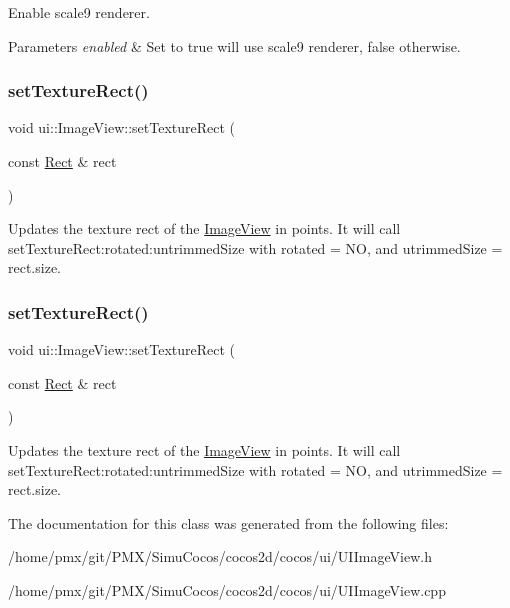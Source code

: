 Enable scale9 renderer.


\begin{DoxyParams}{Parameters}
{\em enabled} & Set to true will use scale9 renderer, false otherwise. \\
\hline
\end{DoxyParams}
\mbox{\label{classui_1_1ImageView_a776968265a527b05e1d13797707e5e2c}} 
\subsubsection{\texorpdfstring{set\+Texture\+Rect()}{setTextureRect()}\hspace{0.1cm}{\footnotesize\ttfamily [1/2]}}
{\footnotesize\ttfamily void ui\+::\+Image\+View\+::set\+Texture\+Rect (\begin{DoxyParamCaption}\item[{const \hyperlink{classRect}{Rect} \&}]{rect }\end{DoxyParamCaption})}

Updates the texture rect of the \hyperlink{classui_1_1ImageView}{Image\+View} in points. It will call set\+Texture\+Rect\+:rotated\+:untrimmed\+Size with rotated = NO, and utrimmed\+Size = rect.\+size. \mbox{\label{classui_1_1ImageView_a776968265a527b05e1d13797707e5e2c}} 
\subsubsection{\texorpdfstring{set\+Texture\+Rect()}{setTextureRect()}\hspace{0.1cm}{\footnotesize\ttfamily [2/2]}}
{\footnotesize\ttfamily void ui\+::\+Image\+View\+::set\+Texture\+Rect (\begin{DoxyParamCaption}\item[{const \hyperlink{classRect}{Rect} \&}]{rect }\end{DoxyParamCaption})}

Updates the texture rect of the \hyperlink{classui_1_1ImageView}{Image\+View} in points. It will call set\+Texture\+Rect\+:rotated\+:untrimmed\+Size with rotated = NO, and utrimmed\+Size = rect.\+size. 

The documentation for this class was generated from the following files\+:\begin{DoxyCompactItemize}
\item 
/home/pmx/git/\+P\+M\+X/\+Simu\+Cocos/cocos2d/cocos/ui/U\+I\+Image\+View.\+h\item 
/home/pmx/git/\+P\+M\+X/\+Simu\+Cocos/cocos2d/cocos/ui/U\+I\+Image\+View.\+cpp\end{DoxyCompactItemize}
